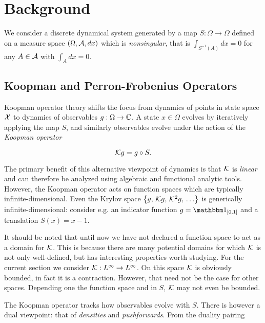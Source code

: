 
\section{Background}

We consider a discrete dynamical system generated by a map $S : \Omega \to \Omega$ defined 
on a measure space $( \Omega, \mathcal{A}, dx )$ which is \emph{nonsingular}, that is 
$\int_{S^{-1} (A)} dx = 0$ for any $A \in \mathcal{A}$ with $\int_A dx = 0$. 


\subsection{Koopman and Perron-Frobenius Operators}

Koopman operator theory shifts the focus from dynamics of points in state space $\mathcal{X}$ to 
dynamics of observables $g : \Omega \to \mathbb{C}$. A state $x \in \Omega$ evolves by iteratively 
applying the map $S$, and similarly observables evolve under the action of the 
\emph{Koopman operator}

\begin{equation}
    \mathcal{K} g = g \circ S . 
\end{equation}

The primary benefit of this alternative viewpoint of dynamics is that $\mathcal{K}$ is 
\emph{linear} and can therefore be analyzed using algebraic and functional analytic tools. 
However, the Koopman operator acts on function spaces which are typically 
infinite-dimensional. Even the Krylov space 
$\left\{ g,\, \mathcal{K} g,\, \mathcal{K}^2 g,\, \ldots \right\}$ is generically infinite-dimensional: 
consider e.g. an indicator function $g = \bbone_{\left[ 0, 1 \right]}$ and a translation 
$S (x) = x - 1$. 

It should be noted that until now we have not declared a function space to act as a domain 
for $\mathcal{K}$. This is because there are many potential domains for which $\mathcal{K}$ is not 
only well-defined, but has interesting properties worth studying. For the current section 
we consider $\mathcal{K} : L^\infty \to L^\infty$. On this space $\mathcal{K}$ is obviously bounded, 
in fact it is a contraction. However, that need not be the case for other spaces. Depending 
one the function space and in $S$, $\mathcal{K}$ may not even be bounded. 

The Koopman operator tracks how observables evolve with $S$. There is however a dual 
viewpoint: that of \emph{densities} and \emph{pushforwards}. From the duality pairing

